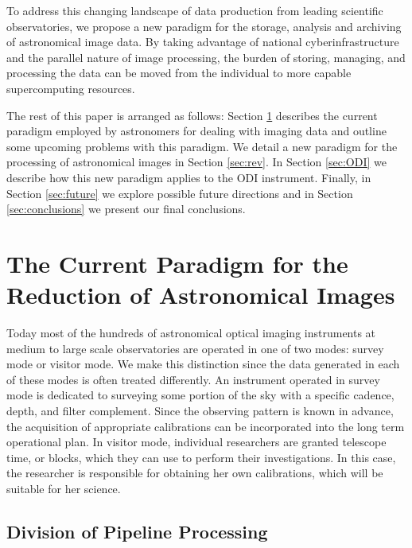 \documentclass[10pt,conference]{IEEEtran}
\begin{document}
To address this changing landscape of data production from leading scientific observatories, we propose a new paradigm for the storage, analysis and archiving of astronomical image data. By taking advantage of national cyberinfrastructure and the parallel nature of image processing, the burden of storing, managing, and processing the data can be moved from the individual to more capable supercomputing resources.  

The rest of this paper is arranged as follows: Section \ref{sec:current} describes the current paradigm employed by astronomers for dealing with imaging data and outline some upcoming problems with this paradigm. We detail a new paradigm for the processing of astronomical images in Section \ref{sec:rev}. In Section \ref{sec:ODI} we describe how this new paradigm applies to the ODI instrument. Finally, in Section \ref{sec:future} we explore possible future directions and in Section \ref{sec:conclusions} we present our final conclusions.

\section{The Current Paradigm for the Reduction of Astronomical Images}\label{sec:current}

Today most of the hundreds of astronomical optical imaging instruments at medium to large scale observatories are operated in one of two modes: survey mode or visitor mode. We make this distinction since the data generated in each of these modes is often treated differently. An instrument operated in survey mode is dedicated to surveying some portion of the sky with a specific cadence, depth, and filter complement. Since the observing pattern is known in advance, the acquisition of appropriate calibrations can be incorporated into the long term operational plan. In visitor mode, individual researchers are granted telescope time, or blocks, which they can use to perform their investigations. In this case, the researcher is responsible for obtaining her own calibrations, which will be suitable for her science. 

\subsection{Division of Pipeline Processing}\label{sec:tiers}
\end{document}
